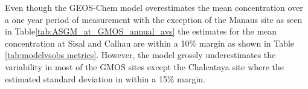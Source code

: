 \begin{table}[H]
\label{tab:ASGM_at_GMOS_annual_avs}

\centering
{}

\end{table}
\begin{flushleft}
 Even though the GEOS-Chem model overestimates the mean concentration over a one year period of measurement with the exception of the Manaus site as seen in Table\ref{tab:ASGM_at_GMOS_annual_avs} the estimates for the mean concentration at Sisal and Calhau are within a 10\% margin as shown in Table \ref{tab:modelvsobs metrics}. However, the model grossly underestimates the variability in most of the GMOS sites except the Chalcataya site where the estimated standard deviation in within a 15\% margin.  
\end{flushleft}

